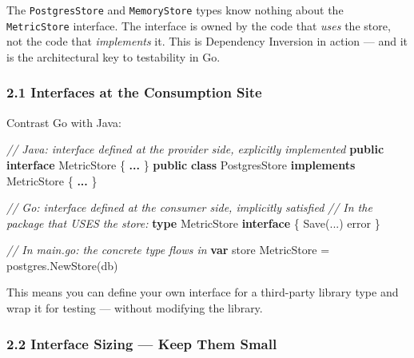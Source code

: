 \documentclass[
]{article}
\newenvironment{Shaded}{}{}
\newcommand{\CommentTok}[1]{\textcolor[rgb]{0.38,0.63,0.69}{\textit{#1}}}
\newcommand{\DataTypeTok}[1]{\textcolor[rgb]{0.56,0.13,0.00}{#1}}
\newcommand{\KeywordTok}[1]{\textcolor[rgb]{0.00,0.44,0.13}{\textbf{#1}}}
\newcommand{\NormalTok}[1]{#1}
\newcommand{\OperatorTok}[1]{\textcolor[rgb]{0.40,0.40,0.40}{#1}}
\begin{document}
The \texttt{PostgresStore} and \texttt{MemoryStore} types know nothing
about the \texttt{MetricStore} interface. The interface is owned by the
code that \emph{uses} the store, not the code that \emph{implements} it.
This is Dependency Inversion in action --- and it is the architectural
key to testability in Go.

\hypertarget{interfaces-at-the-consumption-site}{%
\subsubsection{2.1 Interfaces at the Consumption
Site}\label{interfaces-at-the-consumption-site}}

Contrast Go with Java:

\begin{Shaded}
\begin{Highlighting}[]
\CommentTok{// Java: interface defined at the provider side, explicitly implemented}
\KeywordTok{public} \KeywordTok{interface}\NormalTok{ MetricStore }\OperatorTok{\{} \KeywordTok{...} \OperatorTok{\}}
\KeywordTok{public} \KeywordTok{class}\NormalTok{ PostgresStore }\KeywordTok{implements}\NormalTok{ MetricStore }\OperatorTok{\{} \KeywordTok{...} \OperatorTok{\}}
\end{Highlighting}
\end{Shaded}

\begin{Shaded}
\begin{Highlighting}[]
\CommentTok{// Go: interface defined at the consumer side, implicitly satisfied}
\CommentTok{// In the package that USES the store:}
\KeywordTok{type}\NormalTok{ MetricStore }\KeywordTok{interface} \OperatorTok{\{}\NormalTok{ Save}\OperatorTok{(...)} \DataTypeTok{error} \OperatorTok{\}}

\CommentTok{// In main.go: the concrete type flows in}
\KeywordTok{var}\NormalTok{ store MetricStore }\OperatorTok{=}\NormalTok{ postgres}\OperatorTok{.}\NormalTok{NewStore}\OperatorTok{(}\NormalTok{db}\OperatorTok{)}
\end{Highlighting}
\end{Shaded}

This means you can define your own interface for a third-party library
type and wrap it for testing --- without modifying the library.

\hypertarget{interface-sizing-keep-them-small}{%
\subsubsection{2.2 Interface Sizing --- Keep Them
Small}\label{interface-sizing-keep-them-small}}
\end{document}
